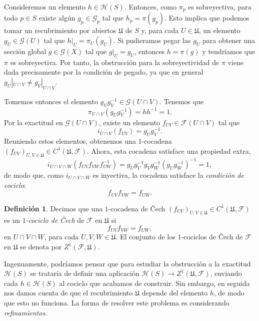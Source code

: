 \documentclass[autocontact]{gaceta}
\theoremstyle{definition} \newtheorem{defn}[thm]{Definición}
\theoremstyle{definition} \newtheorem{ejemplo}[thm]{Ejemplo}
\theoremstyle{definition} \newtheorem{ejercicio}[thm]{Ejercicio}
\def\FF{\mathscr{F}}
\def\GG{\mathscr{G}}
\def\HH{\mathscr{H}}
\def\UU{\mathfrak{U}}
\begin{document}
    Consideremos un elemento $h\in \HH(S)$. Entonces, como $\pi_p$ es sobreyectiva, para todo $p\in S$ existe algún $g_p \in \GG_p$ tal que $h_p=\pi(g_p)$. Esto implica que podemos tomar un recubrimiento por abiertos $\mathfrak{U}$ de $S$ y, para cada $U\in \mathfrak{U}$, un elemento $g_U\in \GG(U)$ tal que $h|_U=\pi_U(g_U)$. Si pudieramos pegar las $g_U$ para obtener una sección global $g\in \GG(X)$ tal que $g|_U = g_U$, entonces $h=\pi(g)$ y tendríamos que $\pi$ es sobreyectiva. Por tanto, la obstrucción para la sobreyectividad de $\pi$ viene dada precisamente por la condición de pegado, ya que en general $g_U|_{U\cap V} \neq g_V|_{U\cap V}$. 
    
    Tomemos entonces el elemento $g_Ug_V^{-1} \in \GG(U\cap V)$. Tenemos que
    \begin{equation*}
      \pi_{U\cap V} (g_U g_V^{-1}) = h h^{-1} = 1.
    \end{equation*}
    Por la exactitud en $\GG(U\cap V)$, existe un elemento $f_{UV}\in \FF(U\cap V)$ tal que
    \begin{equation*}
      i_{U\cap V} (f_{UV}) = g_U g_V^{-1}.
    \end{equation*}
    Reuniendo estos elementos, obtenemos una $1$-cocadena $(f_{UV})_{U,V \in \mathfrak{U}} \in C^1(\UU,\FF)$. Ahora, esta cocadena satisface una propiedad extra,
    \begin{equation*}
      i_{U\cap V\cap W}(f_{UV} f_{VW} f_{UW}^{-1}) = g_U g_V^{-1} g_V g_W^{-1} (g_U g_W^{-1})^{-1} = 1,
    \end{equation*}
    de modo que, como $i_{U\cap V\cap W}$ es inyectiva, la cocadena satisface la \emph{condición de cociclo}:
    \begin{equation*}
      f_{UV} f_{VW} = f_{UW}.
    \end{equation*}

    \begin{defn}
      Decimos que una $1$-cocadena de \v{C}ech $(f_{UV})_{U,V\in \mathfrak{U}}\in C^1(\UU,\FF)$ es un \emph{$1$-cociclo de \v{C}ech} de $\FF$ en $\UU$ si
    \begin{equation*}
      f_{UV} f_{VW} = f_{UW},
    \end{equation*}
    en $U\cap V \cap W$, para cada $U,V,W \in \UU$. El conjunto de los $1$-cociclos de \v{C}ech de $\FF$ en $\UU$ se denota por $Z^1(\FF,\UU)$.
    \end{defn}

    Ingenuamente, podríamos pensar que para estudiar la obstrucción a la exactitud $\HH(S)$ se trataría de definir una aplicación $\HH(S) \rightarrow Z^1(\UU,\FF)$, enviando cada $h\in \HH(S)$ al cociclo que acabamos de construir. Sin embargo, en seguida nos damos cuenta de que el recubrimiento $\UU$ depende del elemento $h$, de modo que esto no funciona. La forma de resolver este problema es considerando \emph{refinamientos}.
\end{document}
